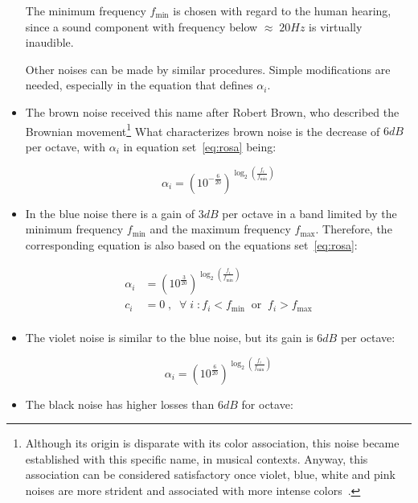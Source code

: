 \begin{itemize}
The minimum frequency $f_{\text{min}}$ is chosen with regard to the human hearing, since a sound component with frequency below $\approx\; 20Hz$ is virtually inaudible.

Other noises can be made by similar procedures. Simple modifications are needed, especially in the equation that defines $\alpha_i$.

  \item The brown noise received this name after Robert Brown, who described the Brownian movement\footnote{Although its origin is disparate with its color association, this noise became established with this specific name, in musical contexts. Anyway, this association can be considered satisfactory once violet, blue, white and pink noises are more strident and associated with more intense colors~\cite{Cook,guillaume}.} What characterizes brown noise is the decrease of $6dB$ per octave, with $\alpha_i$ in equation set~\ref{eq:rosa} being:

\begin{equation}\label{eq:marrom}
 \alpha_i=(10^{-\frac{6}{20}})^{\log _2 \left( \frac{f_i}{f_{\text{min}}} \right )}
\end{equation}

 \item In the blue noise there is a gain of $3dB$ per octave in a band limited by the minimum frequency $f_{\text{min}}$ and the maximum frequency $f_{\text{max}}$. Therefore, the corresponding equation is also based on the equations set~\ref{eq:rosa}:

\begin{equation}\label{eq:azul}
 \begin{split}
 \alpha_i & = (10^{\frac{3}{20}})^{\log _2 \left ( \frac{f_i}{f_{\text{min}}} \right )} \\
 c_i & =0\;,\;\; \forall \; i \; : f_i<f_{\text{min}} \;\; \text{or} \;\; f_i>f_{\text{max}} \\
 \end{split}
\end{equation}

 \item The violet noise is similar to the blue noise, but its gain is $6dB$ per octave:

\begin{equation}\label{eq:violeta}
 \alpha_i = (10^{\frac{6}{20}})^{\log _2 \left ( \frac{f_i}{f_{\text{min}}} \right )}
\end{equation}

 \item The black noise has higher losses than $6dB$ for octave:


\end{itemize}
